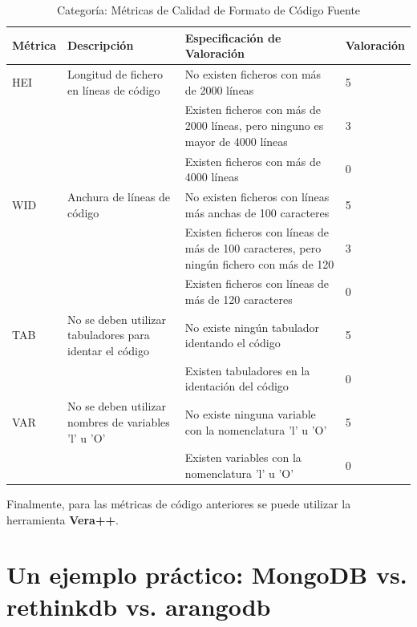 \documentclass[11pt]{article}
\begin{document}
\begin{table}[H]
  \begin{center}
    \begin{tabular}{ | p{1.6cm} | p{3cm} | p{8cm} | p{2cm} | }
    \toprule
    \textbf{Métrica} & \textbf{Descripción} & \textbf{Especificación de Valoración} & \textbf{Valoración} \\
    \hline
    HEI & Longitud de fichero en líneas de código & No existen ficheros con más de 2000 líneas & 5 \\ \cline{3-3} \cline{4-4}
    & & Existen ficheros con más de 2000 líneas, pero ninguno es mayor de 4000 líneas & 3 \\ \cline{3-3}\cline{4-4}
    & & Existen ficheros con más de 4000 líneas & 0 \\ \cline{3-3}\cline{4-4}
    \hline
    WID & Anchura de líneas de código & No existen ficheros con líneas más anchas de 100 caracteres & 5 \\ \cline{3-3} \cline{4-4} 
    & & Existen ficheros con líneas de más de 100 caracteres, pero ningún fichero con más de 120 & 3 \\ \cline{3-3}\cline{4-4}
    & & Existen ficheros con líneas de más de 120 caracteres & 0 \\ \cline{3-3}\cline{4-4}
    \hline
    TAB & No se deben utilizar tabuladores para identar el código & No existe ningún tabulador identando el código & 5 \\ \cline{3-3} \cline{4-4} 
    & & Existen tabuladores en la identación del código & 0 \\ \cline{3-3} \cline{4-4}
    \hline
    VAR & No se deben utilizar nombres de variables 'l' u 'O' & No existe ninguna variable con la nomenclatura 'l' u 'O' & 5 \\ \cline{3-3} \cline{4-4} 
    & & Existen variables con la nomenclatura 'l' u 'O' & 0 \\ 
    \bottomrule
    \end{tabular}
    \caption{Categoría: Métricas de Calidad de Formato de Código Fuente}
    \label{tab:metrics_struct}
  \end{center}
\end{table}

Finalmente, para las métricas de código anteriores se puede utilizar la herramienta \textbf{Vera++}.

\section{Un ejemplo práctico: MongoDB vs. rethinkdb vs. arangodb}
\label{sec:quality_comparison}
\end{document}
